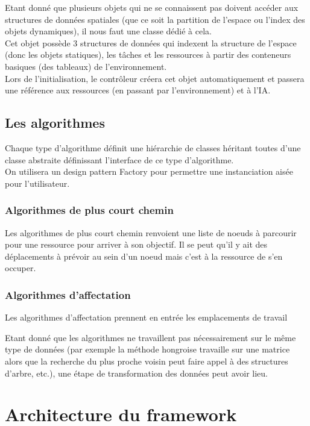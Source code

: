 Etant donné que plusieurs objets qui ne se connaissent pas doivent accéder aux structures de données spatiales (que ce soit la partition de l'espace ou l'index des objets dynamiques), il nous faut une classe dédié à cela.\\
Cet objet possède 3 structures de données qui indexent la structure de l'espace (donc les objets statiques), les tâches et les ressources à partir des conteneurs basiques (des tableaux) de l'environnement.\\

Lors de l'initialisation, le contrôleur créera cet objet automatiquement et passera une référence aux ressources (en passant par l'environnement) et à l'IA.

\subsection{Les algorithmes}
Chaque type d'algorithme définit une hiérarchie de classes héritant toutes d'une classe abstraite définissant l'interface de ce type d'algorithme.\\
On utilisera un design pattern Factory pour permettre une instanciation aisée pour l'utilisateur.

\subsubsection{Algorithmes de plus court chemin}

Les algorithmes de plus court chemin renvoient une liste de noeuds à parcourir pour une ressource pour arriver à son objectif. Il se peut qu'il y ait des déplacements à prévoir au sein d'un noeud mais c'est à la ressource de s'en occuper.

\subsubsection{Algorithmes d'affectation}

Les algorithmes d'affectation prennent en entrée les emplacements de travail 

Etant donné que les algorithmes ne travaillent pas nécessairement sur le même type de données (par exemple la méthode hongroise travaille sur une matrice alors que la recherche du plus proche voisin peut faire appel à des structures d'arbre, etc.), une étape de transformation des données peut avoir lieu.

\section{Architecture du framework}

